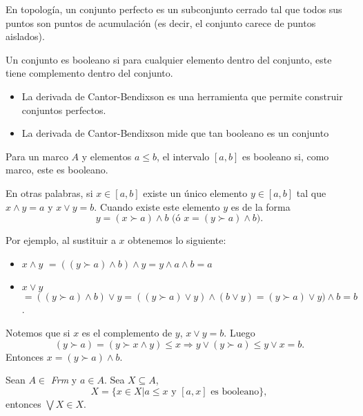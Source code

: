 En topología, un conjunto perfecto es un subconjunto cerrado tal que todos sus puntos son puntos de acumulación (es decir, el conjunto carece de puntos aislados).

Un conjunto es booleano si para cualquier elemento dentro del conjunto, este tiene complemento dentro del conjunto.
\begin{itemize}
\item La derivada de Cantor-Bendixson es una herramienta que permite construir conjuntos perfectos.
\item La derivada de Cantor-Bendixson mide que tan booleano es un conjunto
\end{itemize}

\begin{defn}
Para un marco $A$ y elementos $a\leq b$, el intervalo $[a,b]$ es booleano si, como marco, este es booleano.
\end{defn}

\noindent
En otras palabras, si $x\in[a,b]$ existe un único elemento $y\in[a,b]$ tal que $x\wedge y=a$ y $x\vee y=b$. Cuando existe este elemento $y$ es de la forma $$y=(x\succ a)\wedge b\mbox{  (ó }x=(y\succ a)\wedge b).$$

\noindent
Por ejemplo, al sustituir a $x$ obtenemos lo siguiente:

\begin{itemize}
    \item $x\wedge y$ $=((y\succ a)\wedge b)\wedge y=y\wedge a\wedge b=a$
\item $x\vee y$ $=((y\succ a)\wedge b)\vee y=((y\succ a)\vee y)\wedge (b\vee y)=(y\succ a)\vee y)\wedge b=b$.
\end{itemize}

\noindent
Notemos que si $x$ es el complemento de $y$, $x\vee y=b$. Luego $$(y\succ a)=(y\succ x\wedge y)\leq x\Rightarrow y\vee (y\succ a)\leq y\vee x=b.$$
Entonces $x=(y\succ a)\wedge b.$

\begin{lemma}
Sean $A\in$ \textit{Frm} y $a\in A$. Sea $X\subseteq A$, $$X=\{x\in X|a\leq x\mbox{ y } [a, x]\mbox{ es booleano}\},$$ entonces $\bigvee X\in X$. 
\end{lemma}

